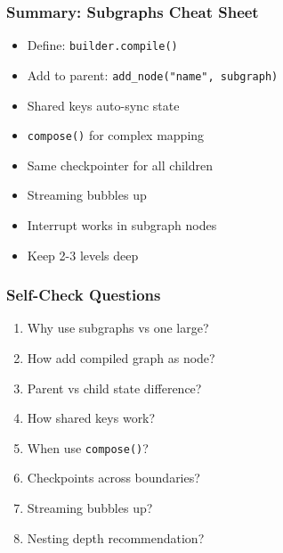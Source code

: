\documentclass[aspectratio=169,11pt]{beamer}
\begin{document}
\begin{frame}
\frametitle{Summary: Subgraphs Cheat Sheet}
\begin{conceptbox}
\setlength{\itemsep}{1pt}
\begin{itemize}
\item Define: \texttt{builder.compile()}
\item Add to parent: \texttt{add\_node("name", subgraph)}
\item Shared keys auto-sync state
\item \texttt{compose()} for complex mapping
\item Same checkpointer for all children
\item Streaming bubbles up
\item Interrupt works in subgraph nodes
\item Keep 2-3 levels deep
\end{itemize}
\end{conceptbox}
\end{frame}

\begin{frame}
\frametitle{Self-Check Questions}
\begin{enumerate}
\setlength{\itemsep}{2pt}
\item Why use subgraphs vs one large?
\item How add compiled graph as node?
\item Parent vs child state difference?
\item How shared keys work?
\item When use \texttt{compose()}?
\item Checkpoints across boundaries?
\item Streaming bubbles up?
\item Nesting depth recommendation?
\end{enumerate}
\end{frame}
\end{document}
